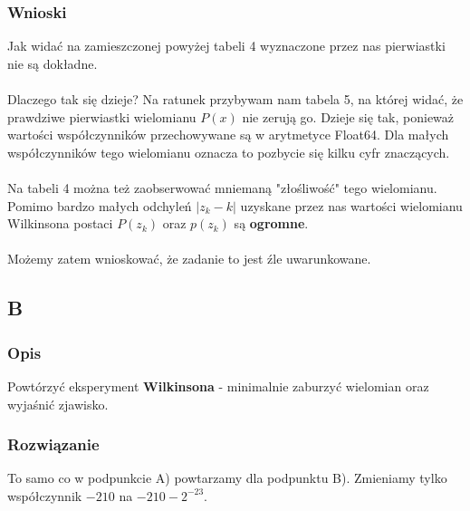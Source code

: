 \documentclass[10pt,a4paper, polish]{article}
\begin{document}
\subsubsection*{Wnioski}
Jak widać na zamieszczonej powyżej tabeli 4 wyznaczone przez nas pierwiastki nie są dokładne. \\\\
Dlaczego tak się dzieje? Na ratunek przybywam nam tabela 5, na której widać, że prawdziwe pierwiastki wielomianu $P(x)$ nie zerują go. Dzieje się tak, ponieważ wartości współczynników przechowywane są w arytmetyce Float64. Dla małych współczynników tego wielomianu oznacza to pozbycie się kilku cyfr znaczących.\\\\
Na tabeli 4 można też zaobserwować mniemaną "złośliwość" tego wielomianu. Pomimo bardzo małych odchyleń $|z_k-k|$ uzyskane przez nas wartości wielomianu Wilkinsona postaci $P(z_k)$ oraz $p(z_k)$ są \textbf{ogromne}.\\\\
Możemy zatem wnioskować, że zadanie to jest źle uwarunkowane.
\subsection*{B}
\subsubsection*{Opis}
Powtórzyć eksperyment \textbf{Wilkinsona} - minimalnie zaburzyć wielomian oraz wyjaśnić zjawisko.
\subsubsection*{Rozwiązanie}
To samo co w podpunkcie A) powtarzamy dla podpunktu B). Zmieniamy tylko współczynnik $-210$ na $-210-2^{-23}$.
\end{document}
